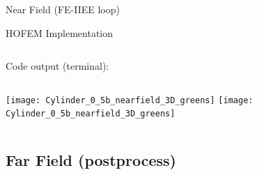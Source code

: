 \begin{frame}[allowframebreaks]{Near Field (FE-IIEE loop)}
\begin{block}{HOFEM Implementation}
    \begin{columns}%
      
      
      
    \end{columns}
  \end{block}



  \framebreak %

 Code output (terminal):
  
 


  \framebreak %


  \begin{columns}
     \centering
    {\texttt{[image: Cylinder\_0\_5b\_nearfield\_3D\_greens]}}
     \centering
    {\texttt{[image: Cylinder\_0\_5b\_nearfield\_3D\_greens]}}
  \end{columns}    

  
\end{frame}


\subsection{Far Field (postprocess)}

